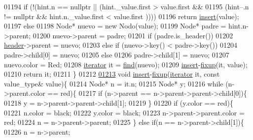 \begin{DoxyCode}
01194         \textcolor{keywordflow}{if} (!(hint.n == \textcolor{keyword}{nullptr} || (hint.\_value.first > value.first && 
01195             (hint--.n != \textcolor{keyword}{nullptr} && hint.n.\_value.first < value.first ))))
01196             \textcolor{keywordflow}{return} \hyperlink{classaed2_1_1map_a60aacba06b1579630b3c8e996cf248c8_a60aacba06b1579630b3c8e996cf248c8}{insert}(value);     
01197         \textcolor{keywordflow}{else}
01198             Node* nuevo = \textcolor{keyword}{new} Nodo(value);
01199             Node* padre = hint.n->parent;
01200             nuevo->parent = padre;
01201             \textcolor{keywordflow}{if} (padre.is\_header())
01202                 \hyperlink{classaed2_1_1map_a92d93f905c8ad73fba18fdc7e8915cce_a92d93f905c8ad73fba18fdc7e8915cce}{header}->parent = nuevo;
01203             \textcolor{keywordflow}{else} if (nuevo->key() < padre->key())
01204                 padre->child[0] = nuevo;
01205             \textcolor{keywordflow}{else}
01206                 padre->child[1] = nuevo;
01207             nuevo.color = Red;
01208             \hyperlink{classaed2_1_1iterator}{iterator} it = \hyperlink{classaed2_1_1map_afd0fc1a8234888e61e0e615de7e245b8_afd0fc1a8234888e61e0e615de7e245b8}{find}(nuevo);
01209             \hyperlink{classaed2_1_1map_a60aacba06b1579630b3c8e996cf248c8_a60aacba06b1579630b3c8e996cf248c8}{insert}-\hyperlink{classaed2_1_1map_a905aa80287bf2a97cca5a9dda1c8ab12_a905aa80287bf2a97cca5a9dda1c8ab12}{fixup}(it, value);
01210             \textcolor{keywordflow}{return} it;
01211   \}
01212 
\hypertarget{map2_8h_source_l01213}{}\hyperlink{classaed2_1_1map_a905aa80287bf2a97cca5a9dda1c8ab12_a905aa80287bf2a97cca5a9dda1c8ab12}{01213} \textcolor{keywordtype}{void} \hyperlink{classaed2_1_1map_a60aacba06b1579630b3c8e996cf248c8_a60aacba06b1579630b3c8e996cf248c8}{insert}-\hyperlink{classaed2_1_1map_a905aa80287bf2a97cca5a9dda1c8ab12_a905aa80287bf2a97cca5a9dda1c8ab12}{fixup}(\hyperlink{classaed2_1_1iterator}{iterator} it, \textcolor{keyword}{const} value\_type& value)\{
01214     Node* n = it.n;
01215     Node* y;
01216 \textcolor{keywordflow}{while} (n->parent.color == red)\{
01217     \textcolor{keywordflow}{if} (n->parent == n->parent->parent->child[0])\{
01218         y = n->parent->parent->child[1];
01219     \}
01220     \textcolor{keywordflow}{if} (y.color == red)\{
01221         n.color = black;
01222         y.color = black;
01223         n->parent->parent.color = red;
01224         n = n->parent->parent;
01225     \} \textcolor{keywordflow}{else} \textcolor{keywordflow}{if}(n == n->parent->child[1])\{
01226         n = n->parent;

\end{DoxyCode}
